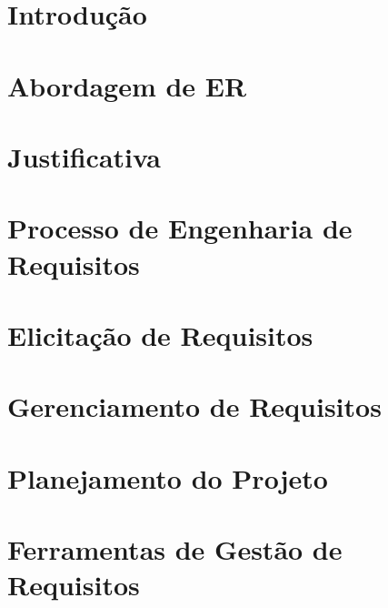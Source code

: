 
\chapter{Introdução}


\chapter{Abordagem de ER}


\chapter{Justificativa}


\chapter{Processo de Engenharia de Requisitos}


\chapter{Elicitação de Requisitos}


\chapter{Gerenciamento de Requisitos}


\chapter{Planejamento do Projeto}


\chapter{Ferramentas de Gestão de Requisitos}

